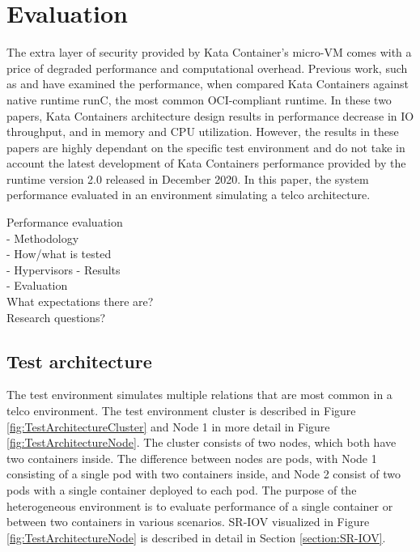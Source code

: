 \chapter{Evaluation}
\label{chapter:evaluation}

The extra layer of security provided by Kata Container's micro-VM comes with a price of degraded performance and computational overhead. Previous work, such as \cite{Kumar2020} and \cite{EverartsdeVelp2020} have examined the performance, when compared Kata Containers against native runtime runC, the most common OCI-compliant runtime. In these two papers, Kata Containers architecture design results in performance decrease in IO throughput, and in memory and CPU utilization. However, the results in these papers are highly dependant on the specific test environment and do not take in account the latest development of Kata Containers performance provided by the runtime version 2.0 released in December 2020. In this paper, the system performance evaluated in an environment simulating a telco architecture.


Performance evaluation \\
- Methodology \\
- How/what is tested \\
    - Hypervisors
- Results \\
- Evaluation \\
What expectations there are? \\
Research questions?

\section{Test architecture}
\label{section:test_architecture}

The test environment simulates multiple relations that are most common in a telco environment. The test environment cluster is described in Figure \ref{fig:TestArchitectureCluster} and Node 1 in more detail in Figure \ref{fig:TestArchitectureNode}. The cluster consists of two nodes, which both have two containers inside. The difference between nodes are pods, with Node 1 consisting of a single pod with two containers inside, and Node 2 consist of two pods with a single container deployed to each pod. The purpose of the heterogeneous environment is to evaluate performance of a single container or between two containers in various scenarios. SR-IOV visualized in Figure \ref{fig:TestArchitectureNode} is described in detail in Section \ref{section:SR-IOV}.

